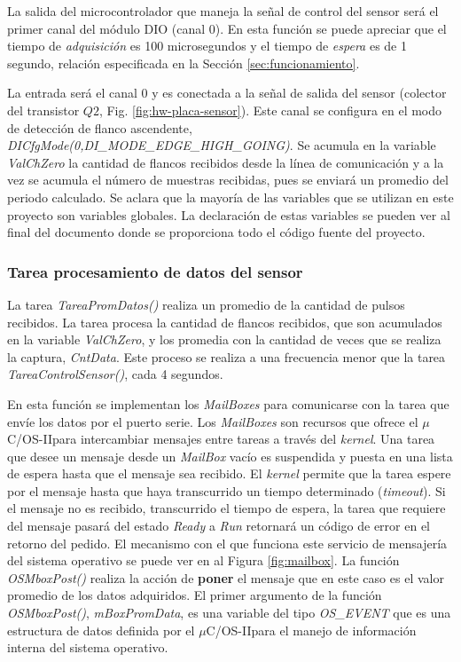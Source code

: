 \documentclass[11pt,a4paper,oneside]{article}
\def\uCOS{$\mu$C/OS-II\texttrademark}
\begin{document}
La salida del microcontrolador que maneja la señal de control del sensor será el primer canal del módulo DIO (canal 0). En esta función se puede apreciar que el tiempo de \emph{adquisición} es 100 microsegundos y el tiempo de \emph{espera} es de 1 segundo, relación especificada en la Sección \ref{sec:funcionamiento}. 

La entrada será el canal 0 y es conectada a la señal de salida del sensor (colector del transistor $Q2$, Fig. \ref{fig:hw-placa-sensor}). Este canal se configura en el modo de detección de flanco ascendente, \emph{DICfgMode(0,DI\_MODE\_EDGE\_HIGH\_GOING)}. Se acumula en la variable \emph{ValChZero} la cantidad de flancos recibidos desde la línea de comunicación y a la vez se acumula el número de muestras recibidas, pues se enviará un promedio del periodo calculado.  Se aclara que la mayoría de las variables que se utilizan en este proyecto son variables globales. La declaración de estas variables se pueden ver al final del documento donde se proporciona todo el código fuente del proyecto.

\subsubsection{Tarea procesamiento de datos del sensor}
\label{sec:tarea-proces-datos}

La tarea \emph{TareaPromDatos()} realiza un promedio de la cantidad de pulsos recibidos. La tarea procesa la cantidad de flancos recibidos, que son acumulados en la variable \emph{ValChZero}, y los promedia con la cantidad de veces que se realiza la captura, \emph{CntData}. Este proceso se realiza a una frecuencia menor que la tarea \emph{TareaControlSensor()}, cada 4 segundos. 

En esta función se implementan los \emph{MailBoxes} para comunicarse con la tarea que envíe los datos por el puerto serie. Los \emph{MailBoxes} son recursos que ofrece el \uCOS para intercambiar mensajes entre tareas a través del \textsl{kernel}. Una tarea que desee un mensaje desde un \emph{MailBox} vacío es suspendida y puesta en una lista de espera hasta que el mensaje sea recibido. El \textsl{kernel} permite que la tarea espere por el mensaje hasta que haya transcurrido un tiempo determinado (\textsl{timeout}). Si el mensaje no es recibido, transcurrido el tiempo de espera, la tarea que requiere del mensaje  pasará del estado \emph{Ready} a \emph{Run} retornará un código de error en el retorno del pedido. El mecanismo con el que funciona este servicio de mensajería del sistema operativo se puede ver en al Figura \ref{fig:mailbox}. La función \emph{OSMboxPost()} realiza la acción de \textbf{poner} el mensaje que en este caso es el valor promedio de los datos adquiridos. El primer argumento de la función \emph{OSMboxPost()}, \emph{mBoxPromData}, es una variable del tipo \emph{OS\_EVENT} que es una estructura de datos definida por el \uCOS para el manejo de información interna del sistema operativo. 
\end{document}
